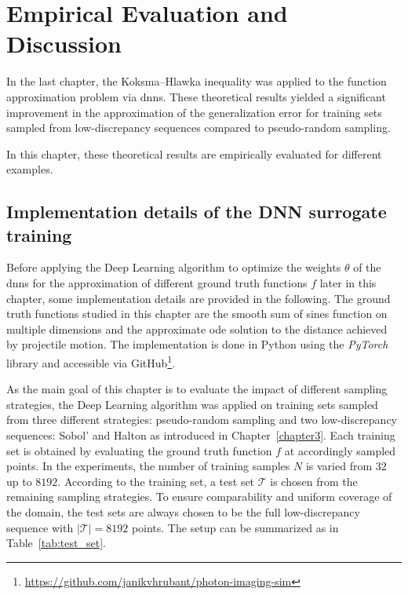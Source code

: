 \chapter{Empirical Evaluation and Discussion}
\label{chapter7}

In the last chapter, the Koksma--Hlawka inequality was applied to the function
approximation problem via \acfp{dnn}. These theoretical results yielded a
significant improvement in the approximation of the generalization error for
training sets sampled from low-discrepancy sequences compared to pseudo-random
sampling.

In this chapter, these theoretical results are empirically evaluated for
different examples.

\section{Implementation details of the DNN surrogate training}
\label{sec:impl_details_dnn}

Before applying the Deep Learning algorithm to optimize the weights $\theta$ of
the \aclp{dnn} for the approximation of different ground truth
functions $f$ later in this chapter, some implementation details are provided in
the following. The ground truth functions studied in this chapter are the smooth
sum of sines function on multiple dimensions and the approximate \acf{ode}
solution to the distance achieved by projectile motion. The implementation is
done in Python using the \emph{PyTorch} library \cite{paszke2019pytorch} and
accessible via
GitHub\footnote{\url{https://github.com/janikvhrubant/photon-imaging-sim}}.

As the main goal of this chapter is to evaluate the impact of different sampling
strategies, the Deep Learning algorithm was applied on training sets sampled
from three different strategies: pseudo-random sampling and two low-discrepancy
sequences: Sobol' and Halton as introduced in Chapter~\ref{chapter3}. Each
training set is obtained by evaluating the ground truth function $f$ at accordingly
sampled points. In the experiments, the number of training samples $N$ is varied
from $32$ up to $8192$. According to the training set, a test set $\mathcal{T}$
is chosen from the remaining sampling strategies. To ensure comparability and
uniform coverage of the domain, the test sets are always chosen to be the full
low-discrepancy sequence with $|\mathcal{T}|=8192$ points. The setup can be
summarized as in Table~\ref{tab:test_set}.

